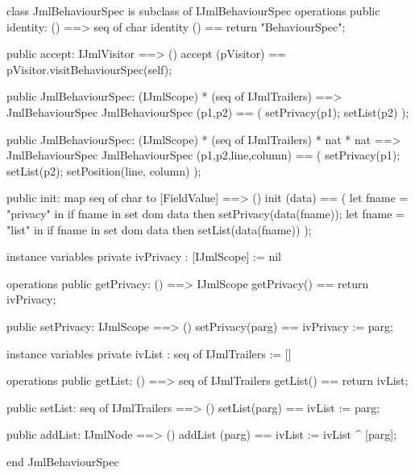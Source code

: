 \begin{vdm_al}
class JmlBehaviourSpec is subclass of IJmlBehaviourSpec
operations
  public identity: () ==> seq of char
  identity () == return "BehaviourSpec";

  public accept: IJmlVisitor ==> ()
  accept (pVisitor) == pVisitor.visitBehaviourSpec(self);

  public JmlBehaviourSpec:
    (IJmlScope) *
    (seq of IJmlTrailers) ==> JmlBehaviourSpec
  JmlBehaviourSpec (p1,p2) == 
    ( setPrivacy(p1);
      setList(p2) );

  public JmlBehaviourSpec:
    (IJmlScope) *
    (seq of IJmlTrailers) *
    nat *
    nat ==> JmlBehaviourSpec
  JmlBehaviourSpec (p1,p2,line,column) == 
    ( setPrivacy(p1);
      setList(p2);
      setPosition(line, column) );

  public init: map seq of char to [FieldValue] ==> ()
  init (data) ==
    ( let fname = "privacy" in
        if fname in set dom data
        then setPrivacy(data(fname));
      let fname = "list" in
        if fname in set dom data
        then setList(data(fname)) );

instance variables
  private ivPrivacy : [IJmlScope] := nil

operations
  public getPrivacy: () ==> IJmlScope
  getPrivacy() == return ivPrivacy;

  public setPrivacy: IJmlScope ==> ()
  setPrivacy(parg) == ivPrivacy := parg;

instance variables
  private ivList : seq of IJmlTrailers := []

operations
  public getList: () ==> seq of IJmlTrailers
  getList() == return ivList;

  public setList: seq of IJmlTrailers ==> ()
  setList(parg) == ivList := parg;

  public addList: IJmlNode ==> ()
  addList (parg) == ivList := ivList ^ [parg];

end JmlBehaviourSpec
\end{vdm_al}

